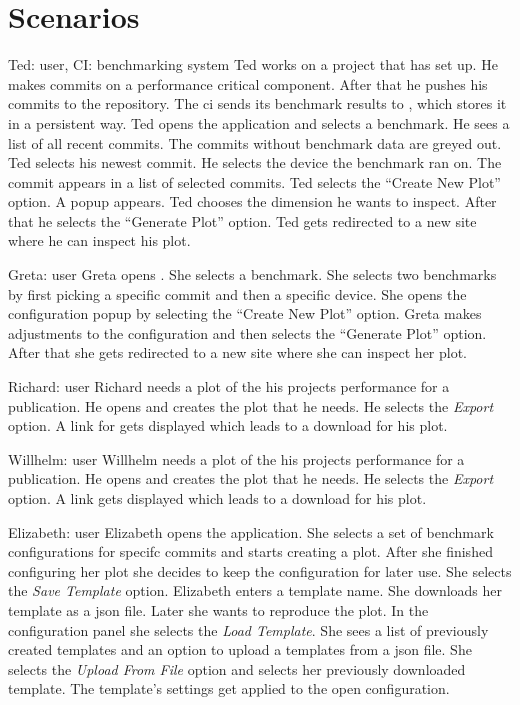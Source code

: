 \section{Scenarios}

{Ted: \Gls{user}, CI: \Gls{benchmarking system}}
{Ted works on a project that has \parkview{} set up. He makes commits on a performance critical component. After that he pushes his commits to the repository. The \acrshort{ci} sends its \glspl{benchmark result} to \parkview{}, which stores it in a persistent way. Ted opens the application and selects a benchmark. He sees a list of all recent commits. The commits without benchmark data are greyed out. Ted selects his newest commit. He selects the device the benchmark ran on. The commit appears in a list of selected commits. Ted selects the \enquote{Create New Plot} option. A popup appears. Ted chooses the dimension he wants to inspect. After that he selects the \enquote{Generate Plot} option. Ted gets redirected to a new site where he can inspect his plot.} 

{Greta: \Gls{user}}
{Greta opens \parkview{}. She selects a \gls{benchmark}. She selects two \glspl{benchmark} by first picking a specific commit and then a specific device. She opens the configuration popup by selecting the \enquote{Create New Plot} option. Greta makes adjustments to the \gls{configuration} and then selects the \enquote{Generate Plot} option. After that she gets redirected to a new site where she can inspect her plot.}

{Richard: \Gls{user}}
{Richard needs a \gls{plot} of the his projects performance for a publication. He opens \parkview{} and creates the plot that he needs. He selects the \emph{Export} option. A link for gets displayed which leads to a download for his \gls{plot}.}

{Willhelm: \Gls{user}}
{Willhelm needs a \gls{plot} of the his projects performance for a publication. He opens \parkview{} and creates the plot that he needs. He selects the \emph{Export} option. A link gets displayed which leads to a download for his \gls{plot}.}

{Elizabeth: \Gls{user}}
{Elizabeth opens the application. She selects a set of \glspl{benchmark configuration} for specifc commits and starts creating a \gls{plot}. After she finished configuring her \gls{plot} she decides to keep the \gls{configuration} for later use. She selects the \emph{Save Template} option. Elizabeth enters a \gls{template} name. She downloads her \gls{template} as a \gls{json} file. Later she wants to reproduce the \gls{plot}. In the configuration panel she selects the \emph{Load Template}. She sees a list of previously created \glspl{template} and an option to upload a \glspl{template} from a \gls{json} file. She selects the \emph{Upload From File} option and selects her previously downloaded \gls{template}. The template's settings get applied to the open \gls{configuration}.}


